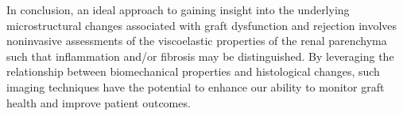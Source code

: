 
In conclusion, an ideal approach to gaining insight into the underlying microstructural changes associated with graft dysfunction and rejection involves noninvasive assessments of the viscoelastic properties of the renal parenchyma such that inflammation and/or fibrosis may be distinguished. By leveraging the relationship between biomechanical properties and histological changes, such imaging techniques have the potential to enhance our ability to monitor graft health and improve patient outcomes.
